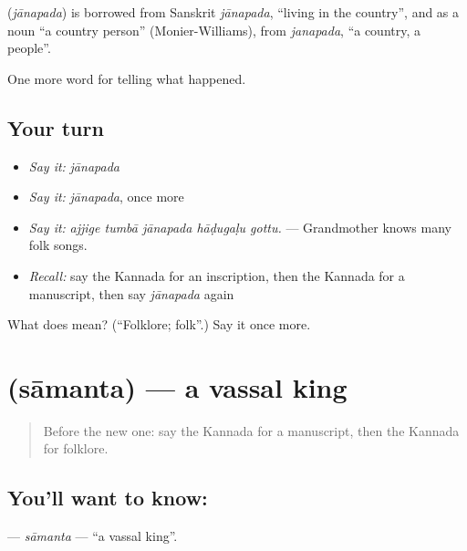 \begin{cousinweb}
\textbf{} (\emph{jānapada}) is borrowed from Sanskrit \emph{jānapada}, \textquotedblleft{}living in the country\textquotedblright{}, and as a noun \textquotedblleft{}a country person\textquotedblright{} (Monier-Williams), from \emph{janapada}, \textquotedblleft{}a country, a people\textquotedblright{}.
\end{cousinweb}

\begin{grammarlens}[title={What you've built}]
One more word for telling what happened.
\end{grammarlens}

\subsection*{Your turn}
\begin{itemize}
\raggedright
  \item \emph{Say it:} \emph{jānapada}
  \item \emph{Say it:} \emph{jānapada}, once more
  \item \emph{Say it:} \emph{ajjige tumbā jānapada hāḍugaḷu gottu.} — Grandmother knows many folk songs.
  \item \emph{Recall:} say the Kannada for an inscription, then the Kannada for a manuscript, then say \emph{jānapada} again
\end{itemize}

\begin{tcolorbox}[breakable,colback=teal!4,colframe=teal!35!black,title={Before you move on}]
What does  mean? (\textquotedblleft{}Folklore; folk\textquotedblright{}.) Say it once more.
\end{tcolorbox}
\section[\texorpdfstring{\kn{ಸಾಮಂತ} (sāmanta)}{ಸಾಮಂತ (sāmanta)}]{ (sāmanta) — a vassal king}

\label{lesson:KA-C356-samanta}



\begin{quote}
Before the new one: say the Kannada for a manuscript, then the Kannada for folklore.
\end{quote}

\subsection*{You'll want to know: }
\textbf{} — \emph{sāmanta} — \textquotedblleft{}a vassal king\textquotedblright{}.

